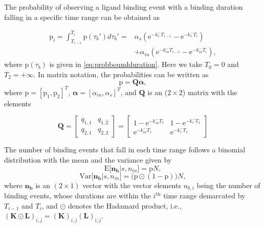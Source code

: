 \documentclass[twocolumn]{IEEEtran}
\newcommand{\p}{\mathrm{p}}
\newcommand{\E}{\mathrm{E}}
\newcommand{\e}{\mathrm{e}}
\newcommand{\Var}{\mathrm{Var}}
\begin{document}
The probability of observing a ligand binding event with a binding duration falling in a specific time range can be obtained as


\begin{align}
\p_i = \int_{T_{i-1}}^{T_i} \p(\tau_b') d\tau_b' =&   \alpha_s \left( \e^{-k_s^- T_{i-1}} - \e^{-k_s^- T_{i}} \right) \\ \nonumber
&+ \alpha_{in} \left( \e^{-k_{in}^- T_{i-1}} - \e^{-k_{in}^- T_{i}} \right),
\end{align}
where $\p(\tau_b)$ is given in \eqref{eq:probboundduration}. Here we take $T_0 = 0$ and $T_2 = +\infty$. In matrix notation, the probabilities can be written as
\begin{equation} \label{eq:probmatrix}
\bm{\p} = \bm{Q} \bm{\alpha},
\end{equation}
where $\bm{\p} = [\p_1, \p_2]^T$,  $\bm{\alpha} = [\alpha_{in}, \alpha_s]^T$, and $\bm{Q}$ is an ($2 \times 2$) matrix with the elements 
%


\[
\bm{Q}=
\begin{bmatrix}
q_{1,1} & q_{1,2} \\
q_{2,1} & q_{2,2}
\end{bmatrix}
=
\begin{bmatrix}
1 - \e^{-k^-_{in} T_1} & 1- \e^{-k^-_s T_{1}} \\
\e^{-k^-_{in} T_{1}} & \e^{-k^-_s T_{1}}
\end{bmatrix}
\]



The number of binding events that fall in each time range follows a binomial distribution with the mean and the variance given by
\begin{equation}
\bm{\E[n_b}|s,n_{in}\bm{]} = \bm{\p} N,
\label{eq:meann}
\end{equation}
\begin{equation}
\bm{\Var[n_b}|s,n_{in}\bm{]} = \bigl( \bm{\p} \odot (1-\bm{\p}) \bigr) N,
\label{eq:varn}
\end{equation}
where $\bm{n_b}$ is an $(2 \times 1)$ vector with the vector elements $n_{b,i}$ being the number of binding events, whose durations are within the $i^\text{th}$ time range demarcated by $T_{i-1}$ and $T_i$, and $\odot$ denotes the Hadamard product, i.e., $(\bm{K} \odot \bm{L})_{i,j} = (\bm{K})_{i,j} (\bm{L})_{i,j}$. 
\end{document}

